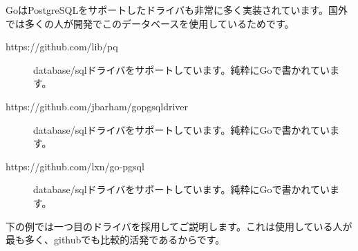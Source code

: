 GoはPostgreSQLをサポートしたドライバも非常に多く実装されています。国外では多くの人が開発でこのデータベースを使用しているためです。

\begin{description}
  \item[https://github.com/lib/pq] database/sqlドライバをサポートしています。純粋にGoで書かれています。
  \item[https://github.com/jbarham/gopgsqldriver] database/sqlドライバをサポートしています。純粋にGoで書かれています。
  \item[https://github.com/lxn/go-pgsql] database/sqlドライバをサポートしています。純粋にGoで書かれています。
\end{description}

下の例では一つ目のドライバを採用してご説明します。これは使用している人が最も多く、githubでも比較的活発であるからです。
